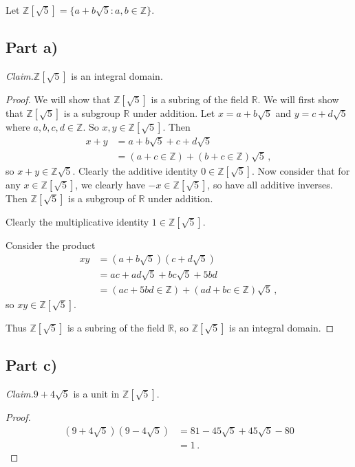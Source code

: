 \documentclass{abrice}
\newcommand{\Z}{\mathbb{Z}}
\newcommand{\R}{\mathbb{R}}
\newcommand{\Claim}{\noindent\emph{Claim.}\xspace}%
\begin{document}
Let $\Z[\sqrt 5] = \{a + b \sqrt 5 : a,b \in \Z\}$.

\subsection{Part a)}

\Claim $\Z[\sqrt 5]$ is an integral domain.

\begin{proof}
  We will show that $\Z[\sqrt 5]$ is a subring of the field $\R$. We will first
  show that $\Z[\sqrt 5]$ is a subgroup $\R$ under addition. Let $x = a +
  b \sqrt 5$ and $y = c + d \sqrt 5$ where $a,b,c,d \in \Z$. So $x,y \in
  \Z[\sqrt 5]$. Then
  \begin{align*}
    x + y
    &= a + b \sqrt 5 + c + d \sqrt 5 \\
    &= (a + c \in \Z) + (b + c \in \Z) \sqrt 5\, ,
  \end{align*}
  so $x + y \in \Z \sqrt 5$. Clearly the additive identity $0 \in \Z[\sqrt 5]$.
  Now consider that for any $x \in \Z[\sqrt 5]$, we clearly have $-x \in
  \Z[\sqrt 5]$, so have all additive inverses. Then $\Z[\sqrt 5]$ is a subgroup
  of $\R$ under addition.

  Clearly the multiplicative identity $1 \in \Z[\sqrt 5]$.

  Consider the product
  \begin{align*}
    xy
    &= (a + b \sqrt 5)(c + d \sqrt 5) \\
    &= ac + ad \sqrt 5 + bc \sqrt 5 + 5 bd \\
    &= (ac + 5bd \in \Z) + (ad + bc \in \Z)\sqrt 5\, ,
  \end{align*}
  so $xy \in \Z[\sqrt 5]$.

  Thus $\Z[\sqrt 5]$ is a subring of the field $\R$, so $\Z[\sqrt 5]$ is an
  integral domain.
\end{proof}

\subsection{Part c)}

\Claim $9 + 4 \sqrt 5$ is a unit in $\Z[\sqrt 5]$.

\begin{proof}
  \begin{align*}
    (9 + 4 \sqrt 5)(9 - 4 \sqrt 5)
    &= 81 - 45 \sqrt 5 + 45 \sqrt 5 - 80 \\
    &= 1\, .
  \end{align*}
\end{proof}
\end{document}
